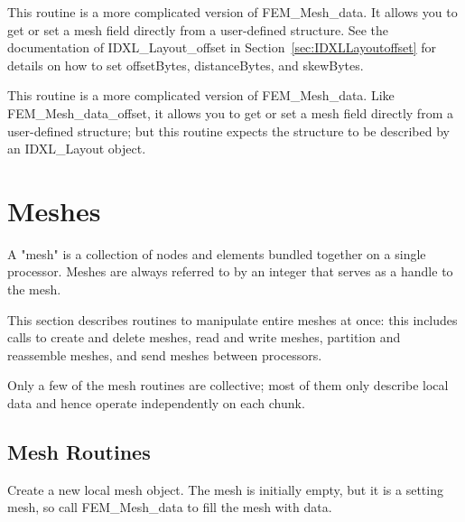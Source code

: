 This routine is a more complicated version of FEM\_Mesh\_data.
It allows you to get or set a mesh field directly
from a user-defined structure.  See the documentation of
IDXL\_Layout\_offset in Section~\ref{sec:IDXLLayoutoffset}
for details on how to set offsetBytes, distanceBytes, and skewBytes.


This routine is a more complicated version of FEM\_Mesh\_data.
Like FEM\_Mesh\_data\_offset, it allows you to get or set a mesh
field directly from a user-defined structure; but this routine
expects the structure to be described by an IDXL\_Layout object.

\section{Meshes}
\label{sec:mesh}

A "mesh" is a collection of nodes and elements 
bundled together on a single processor.
Meshes are always referred to by an integer that 
serves as a handle to the mesh.

This section describes routines to manipulate entire meshes
at once: this includes calls to create and delete meshes,
read and write meshes,
partition and reassemble meshes, and send meshes between
processors.

Only a few of the mesh routines are collective; 
most of them only describe local data and hence 
operate independently on each chunk.


\subsection{Mesh Routines}


Create a new local mesh object.  The mesh is initially empty,
but it is a setting mesh, so call FEM\_Mesh\_data 
to fill the mesh with data.



